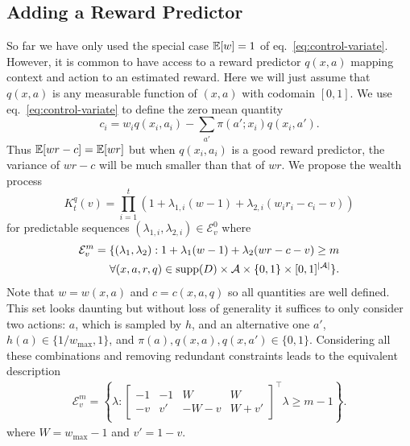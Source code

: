 \subsection{Adding a Reward Predictor}
\label{sec:reward-predictor}
So far we have only used the special case $\mathbb{E}[w]=1$ of
eq.~\eqref{eq:control-variate}. However, it is common to have access to a
reward predictor $q(x,a)$ mapping context and action to an estimated reward.
Here we will just assume that $q(x,a)$ is any measurable function of $(x,a)$
with codomain $[0,1]$. We use eq.~\eqref{eq:control-variate} to define the 
zero mean quantity
\begin{equation}
c_i=w_i q(x_i,a_i)-\sum_{a'}\pi(a';x_i)q(x_i,a').    
\label{eq:ci-defn}
\end{equation}
Thus $\mathbb{E}[wr-c]=\mathbb{E}[wr]$ but when $q(x_i, a_i)$ is a good 
reward predictor, the variance of $wr - c$ will be much 
smaller than that of $wr$. We propose the wealth process
\[
K_t^q(v)=\prod_{i=1}^{t}\left(1+\lambda_{1,i} (w-1)+\lambda_{2,i}(w_i r_i-c_i-v)\right)
\]
for predictable sequences 
$(\lambda_{1,i}, \lambda_{2,i}) \in \mathcal{E}_{v}^0$ where
\begin{align*}
\mathcal{E}_v^{m} =
\{(\lambda_1,\lambda_2):  1+\lambda_1(w-1)+\lambda_2(wr-c-v)\geq m \notag\\
\forall (x,a,r,q) \in \operatorname{supp}(D) \times \mathcal{A} \times \{0,1\} \times [0,1]^{|\mathcal{A}|}
\}.
\end{align*}
Note that $w=w(x, a)$ and $c=c(x,a,q)$ so all quantities are well defined.
This set looks daunting but without loss of generality it suffices to
only consider two 
actions: $a$, which is sampled by $h$, and an alternative one $a'$,
$h(a) \in \{1/w_{\max},1\}$, and $\pi(a),q(x,a),q(x,a') \in \{0,1\}$.
Considering all these combinations and removing redundant constraints 
leads to the equivalent description
\begin{align}
\mathcal{E}_v^{m} =
\left\{\lambda:  
\left[\begin{array}{cccc}
-1 & -1 & W & W \\ 
-v & v' & -W-v & W+v'
\end{array}\right]^\top
\lambda \geq m - 1 \label{eq:rp-explicit-domain}
\right\}.
\end{align}
where $W = w_{\max}-1$ and $v'=1-v$.

